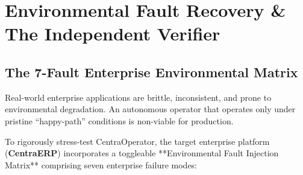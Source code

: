 \section{Environmental Fault Recovery \& The Independent Verifier}
\label{sec:fault_recovery}

\subsection{The 7-Fault Enterprise Environmental Matrix}
Real-world enterprise applications are brittle, inconsistent, and prone to environmental degradation. An autonomous operator that operates only under pristine ``happy-path'' conditions is non-viable for production.

To rigorously stress-test CentraOperator, the target enterprise platform (\textbf{CentraERP}) incorporates a toggleable **Environmental Fault Injection Matrix** comprising seven enterprise failure modes:


